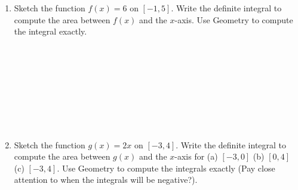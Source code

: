 \documentclass[12pt]{article}
\begin{document}
\begin{enumerate}
    \item Sketch the function $f(x)=6$ on $[-1,5]$. Write the definite integral to compute the area between $f(x)$ and the $x$-axis. Use Geometry to compute the integral exactly.\\\\\\\\\\\\\\\\\\
    \item Sketch the function $g(x)=2x$ on $[-3,4]$. Write the definite integral to compute the area between $g(x)$ and the $x$-axis for (a) $[-3,0]$  (b) $[0,4]$  (c) $[-3,4]$. Use Geometry to compute the integrals exactly (Pay close attention to when the integrals will be negative?).\\\\\\\\\\\\\\\\\\\\\\
        

\end{enumerate}
\end{document}
